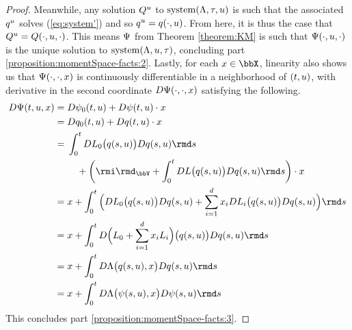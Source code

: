 \begin{proof}
  Meanwhile, any solution $Q^u$ to $\operatorname{system}(\Lambda,\tau,u)$ is such that the associated $q^u$ solves (\ref{eq:system'}) and so $q^u = q(\cdot,u)$.
  From here, it is thus the case that $Q^u = Q(\cdot,u,\cdot)$.
  This means $\Psi$ from Theorem \ref{theorem:KM} is such that $\Psi(\cdot,u,\cdot)$ is the unique solution to $\operatorname{system}(\Lambda,u,\tau)$, concluding part \ref{proposition:momentSpace-facts:2}.
  Lastly, for each $\stateVar\in\stateSpace$, linearity also shows us that $\Psi(\cdot,\cdot,x)$ is continuously differentiable in a neighborhood of $(t, u)$, with derivative in the second coordinate $D\Psi(\cdot,\cdot,x)$ satisfying the following.
  \begin{align*}
    D\aff(t,\momentVar,\stateVar)
    &= D\affPart_0(t,\momentVar) + D\affPart(t,\momentVar)\cdot\stateVar \\
    &= D q_0(t,\momentVar) + Dq(t,\momentVar)\cdot\stateVar \\
    &= \begin{aligned}[t]
      &\int_0^t D\odePart_0\big(q(s,\momentVar)\big) Dq(s,\momentVar) \rmd s \\
      &\quad+ \left(\id_\vecSpace + \int_0^t D\odePart\big(q(s,\momentVar)\big)D q(s,\momentVar) \rmd s\right)\cdot\stateVar 
    \end{aligned} \\
    &= \stateVar + \int_0^t \Big( D\odePart_0\big(q(s,\momentVar) \big) Dq(s,\momentVar) + \sum_{i=1}^d \stateVar_i D\odePart_i\big(q(s,\momentVar) \big) Dq(s,\momentVar) \Big) \rmd s \\
    &= \stateVar + \int_0^t D\Big( \odePart_0 + \sum_{i=1}^d \stateVar_i \odePart_i \Big)\big(q(s,\momentVar)\big) Dq(s,\momentVar)  \rmd s \\
    &= \stateVar + \int_0^t D\ode\big(q(s,\momentVar), \stateVar\big) Dq(s,\momentVar)  \rmd s \\
    &= \stateVar + \int_0^t D\ode\big(\affPart(s,\momentVar), \stateVar\big) D\affPart(s,\momentVar) \rmd s 
  \end{align*}
  This concludes part \ref{proposition:momentSpace-facts:3}.
\end{proof}
